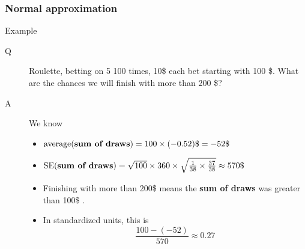 \documentclass[handout]{beamer}
\begin{document}

   \begin{frame} \frametitle{Normal approximation}

   \begin{block}
   {Example}
   \begin{description}
   \item[Q] Roulette, betting on {\color{red} 5} 100 times, 10\$ each bet starting with 100 \$.
     What are the chances we will finish with more than 200 \$?
   \item[A] We know
     \begin{itemize}
     \item $\text{average({\bf sum of draws})} = 100 \times (-0.52)\$ = -52\$ $
     \item $\text{SE({\bf sum of draws})} = \sqrt{100} \times 360 \times \sqrt{\frac{1}{38} \times \frac{37}{38}} \approx 570\$ $
     \item Finishing with more than 200\$ means the {\bf sum of draws} was greater than 100\$ .
       \item In standardized units, this is
       $$
       \frac{100-(-52)}{570} \approx 0.27
       $$
     \end{itemize}
   \end{description}
   \end{block}
   \end{frame}

\end{document}
